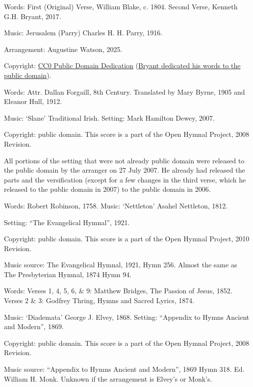 \begin{multicols}{2}
\par\noindent
Words: First (Original) Verse, Will­iam Blake, c. 1804. Second Verse, Kenneth G.H. Bryant, 2017.
\par\noindent
Music: Je­ru­sa­lem (Par­ry) Charles H. H. Par­ry, 1916.
\par\noindent
Arrangement: Augustine Watson, 2025.
\par\noindent
Copyright: \href{https://creativecommons.org/publicdomain/zero/1.0/}{CC0 Public Domain Dedication} (\href{https://imslp.org/wiki/Jerusalem_(Parry,_Charles_Hubert_Hastings)}{Bryant dedicated his words to the public domain}).

\par\noindent
Words: Attr. Dallan Forgaill, 8th Century.  Translated by Mary Byrne, 1905 and Eleanor Hull, 1912. 
\par\noindent
Music: `Slane' Traditional Irish.  Setting: Mark Hamilton Dewey, 2007.
\par\noindent
Copyright: public domain. This score is a part of the Open Hymnal Project, 2008 Revision. 
\par\noindent
All portions of the setting that were not already public domain were released to the public domain by the arranger on 27 July 2007. He already had released the parts and the versification (except for a few changes in the third verse, which he released to the public domain in 2007) to the public domain in 2006.

\par\noindent
Words: Robert Robinson, 1758.  Music: `Nettleton' Asahel Nettleton, 1812. 
\par\noindent
Setting: ``The Evangelical Hymnal'', 1921.
\par\noindent
Copyright: public domain. This score is a part of the Open Hymnal Project, 2010 Revision.
\par\noindent
Music source: The Evangelical Hymnal, 1921, Hymn 256.  Almost the same as The Presbyterian Hymnal, 1874 Hymn 94.

\par\noindent
Words: Verses 1, 4, 5, 6, \& 9: Matthew Bridges, The Passion of Jesus, 1852. Verses 2 \& 3: Godfrey Thring, Hymns and Sacred Lyrics, 1874. 
\par\noindent
Music: `Diademata' George J. Elvey, 1868.  Setting: ``Appendix to Hymns Ancient and Modern'', 1869.
\par\noindent
Copyright: public domain. This score is a part of the Open Hymnal Project, 2008 Revision.
\par\noindent
Music source: ``Appendix to Hymns Ancient and Modern'', 1869 Hymn 318. Ed. William H. Monk.  Unknown if the arrangement is Elvey's or Monk's.


\end{multicols}
